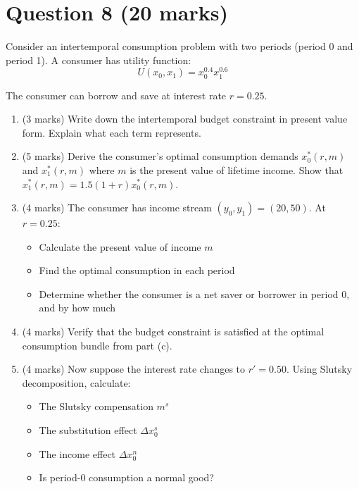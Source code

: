\documentclass[12pt]{article}
\begin{document}
\medskip

\newpage
\section*{Question 8 (20 marks)}

Consider an intertemporal consumption problem with two periods (period 0 and period 1). A consumer has utility function:
\[
U(x_0, x_1) = x_0^{0.4} x_1^{0.6}
\]

The consumer can borrow and save at interest rate $r = 0.25$.

\begin{enumerate}[label=(\alph*)]
\item (3 marks) Write down the intertemporal budget constraint in present value form. Explain what each term represents.

\item (5 marks) Derive the consumer's optimal consumption demands $x_0^*(r, m)$ and $x_1^*(r, m)$ where $m$ is the present value of lifetime income. Show that $x_1^*(r, m) = 1.5(1+r) x_0^*(r, m)$.

\item (4 marks) The consumer has income stream $(y_0, y_1) = (20, 50)$. At $r = 0.25$:
\begin{itemize}
\item Calculate the present value of income $m$
\item Find the optimal consumption in each period
\item Determine whether the consumer is a net saver or borrower in period 0, and by how much
\end{itemize}

\item (4 marks) Verify that the budget constraint is satisfied at the optimal consumption bundle from part (c).

\item (4 marks) Now suppose the interest rate changes to $r' = 0.50$. Using Slutsky decomposition, calculate:
\begin{itemize}
\item The Slutsky compensation $m^s$
\item The substitution effect $\Delta x_0^s$
\item The income effect $\Delta x_0^n$
\item Is period-0 consumption a normal good?
\end{itemize}
\end{enumerate}
\end{document}
